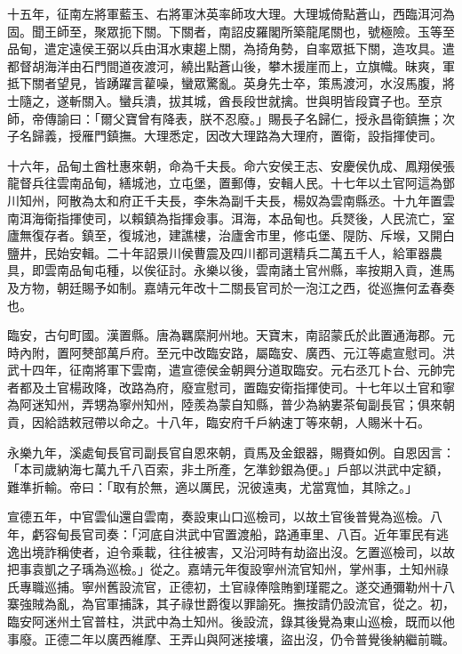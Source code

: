 \begin{pinyinscope}
十五年，征南左將軍藍玉、右將軍沐英率師攻大理。大理城倚點蒼山，西臨洱河為固。聞王師至，聚眾扼下關。下關者，南詔皮羅閣所築龍尾關也，號極險。玉等至品甸，遣定遠侯王弼以兵由洱水東趨上關，為掎角勢，自率眾抵下關，造攻具。遣都督胡海洋由石門間道夜渡河，繞出點蒼山後，攀木援崖而上，立旗幟。昧爽，軍抵下關者望見，皆踴躍言雚噪，蠻眾驚亂。英身先士卒，策馬渡河，水沒馬腹，將士隨之，遂斬關入。蠻兵潰，拔其城，酋長段世就擒。世與明皆段寶子也。至京師，帝傳諭曰：「爾父寶曾有降表，朕不忍廢。」賜長子名歸仁，授永昌衛鎮撫；次子名歸義，授雁門鎮撫。大理悉定，因改大理路為大理府，置衛，設指揮使司。

十六年，品甸土酋杜惠來朝，命為千夫長。命六安侯王志、安慶侯仇成、鳳翔侯張龍督兵往雲南品甸，繕城池，立屯堡，置郵傳，安輯人民。十七年以土官阿這為鄧川知州，阿散為太和府正千夫長，李朱為副千夫長，楊奴為雲南縣丞。十九年置雲南洱海衛指揮使司，以賴鎮為指揮僉事。洱海，本品甸也。兵燹後，人民流亡，室廬無復存者。鎮至，復城池，建譙樓，治廬舍市里，修屯堡、隄防、斥堠，又開白鹽井，民始安輯。二十年詔景川侯曹震及四川都司選精兵二萬五千人，給軍器農具，即雲南品甸屯種，以俟征討。永樂以後，雲南諸土官州縣，率按期入貢，進馬及方物，朝廷賜予如制。嘉靖元年改十二關長官司於一泡江之西，從巡撫何孟春奏也。

臨安，古句町國。漢置縣。唐為羈縻牁州地。天寶末，南詔蒙氏於此置通海郡。元時內附，置阿僰部萬戶府。至元中改臨安路，屬臨安、廣西、元江等處宣慰司。洪武十四年，征南將軍下雲南，遣宣德侯金朝興分道取臨安。元右丞兀卜台、元帥完者都及土官楊政降，改路為府，廢宣慰司，置臨安衛指揮使司。十七年以土官和寧為阿迷知州，弄甥為寧州知州，陸羨為蒙自知縣，普少為納婁茶甸副長官；俱來朝貢，因給誥敕冠帶以命之。十八年，臨安府千戶納速丁等來朝，人賜米十石。

永樂九年，溪處甸長官司副長官自恩來朝，貢馬及金銀器，賜賚如例。自恩因言：「本司歲納海七萬九千八百索，非土所產，乞準鈔銀為便。」戶部以洪武中定額，難準折輸。帝曰：「取有於無，適以厲民，況彼遠夷，尤當寬恤，其除之。」

宣德五年，中官雲仙還自雲南，奏設東山口巡檢司，以故土官後普覺為巡檢。八年，虧容甸長官司奏：「河底自洪武中官置渡船，路通車里、八百。近年軍民有逃逸出境詐稱使者，迫令乘載，往往被害，又沿河時有劫盜出沒。乞置巡檢司，以故把事袁凱之子瑀為巡檢。」從之。嘉靖元年復設寧州流官知州，掌州事，土知州祿氏專職巡捕。寧州舊設流官，正德初，土官祿俸陰賄劉瑾罷之。遂交通彌勒州十八寨強賊為亂，為官軍捕誅，其子祿世爵復以罪諭死。撫按請仍設流官，從之。初，臨安阿迷州土官普柱，洪武中為土知州。後設流，錄其後覺為東山巡檢，既而以他事廢。正德二年以廣西維摩、王弄山與阿迷接壤，盜出沒，仍令普覺後納繼前職。


\end{pinyinscope}
